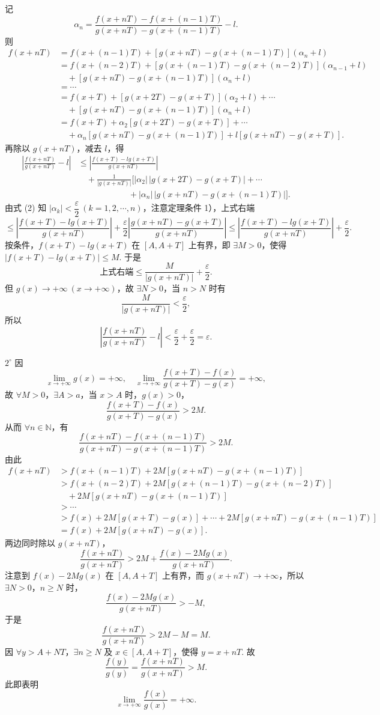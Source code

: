 \documentclass[UTF8, 12pt, fontset=fandol, oneside]{ctexart}
\begin{document}
记
\[
  \alpha_n=
  \frac{f(x+nT)-f(x+(n-1)T)}
  {g(x+nT)-g(x+(n-1)T)}-l. \tag{4}
\]
则
\[
\begin{aligned}
f(x+nT)
&=f(x+(n-1)T)+[g(x+nT)-g(x+(n-1)T)](\alpha_n+l)\\
&=f(x+(n-2)T)+[g(x+(n-1)T)-g(x+(n-2)T)](\alpha_{n-1}+l)\\
&\quad+[g(x+nT)-g(x+(n-1)T)](\alpha_n+l)\\
&=\cdots\\
&=f(x+T)+[g(x+2T)-g(x+T)](\alpha_2+l)+\cdots\\
&\quad+[g(x+nT)-g(x+(n-1)T)](\alpha_n+l)\\
&=f(x+T)+\alpha_2[g(x+2T)-g(x+T)]+\cdots\\
&\quad+\alpha_n[g(x+nT)-g(x+(n-1)T)]
  +l[g(x+nT)-g(x+T)].
\end{aligned}
\]
再除以 $g(x+nT)$，减去 $l$，得
\[
\begin{aligned}
\left|\frac{f(x+nT)}{g(x+nT)}-l\right|
&\le
\left|\frac{f(x+T)-lg(x+T)}{g(x+nT)}\right|\\
&\quad+\frac1{|g(x+nT)|}\bigl[
|\alpha_2|\,|g(x+2T)-g(x+T)|+\cdots\\
&\qquad\qquad\qquad
 +|\alpha_n|\,|g(x+nT)-g(x+(n-1)T)|\bigr].
\end{aligned}
\]
由式 (2) 知 $|\alpha_k|<\dfrac\varepsilon2\ (k=1,2,\cdots,n)$，注意定理条件 1），上式右端
\[
\le
\left|\frac{f(x+T)-lg(x+T)}{g(x+nT)}\right|
+\frac\varepsilon2
\left|\frac{g(x+nT)-g(x+T)}{g(x+nT)}\right|
\le
\left|\frac{f(x+T)-lg(x+T)}{g(x+nT)}\right|+\frac\varepsilon2.
\]
按条件，$f(x+T)-lg(x+T)$ 在 $[A,A+T]$ 上有界，即 $\exists M>0$，使得
$|f(x+T)-lg(x+T)|\le M$. 于是
\[
  \text{上式右端}\le\frac{M}{|g(x+nT)|}+\frac\varepsilon2.
\]
但 $g(x)\to+\infty\ (x\to+\infty)$，故 $\exists N>0$，当 $n>N$ 时有
\[
  \frac{M}{|g(x+nT)|}<\frac\varepsilon2,
\]
所以
\[
  \left|\frac{f(x+nT)}{g(x+nT)}-l\right|
  <\frac\varepsilon2+\frac\varepsilon2=\varepsilon.
\]

$2^\circ$ 因
\[
  \lim_{x\to+\infty}g(x)=+\infty,\quad
  \lim_{x\to+\infty}\frac{f(x+T)-f(x)}{g(x+T)-g(x)}=+\infty,
\]
故 $\forall M>0$，$\exists A>a$，当 $x>A$ 时，$g(x)>0$，
\[
  \frac{f(x+T)-f(x)}{g(x+T)-g(x)}>2M.
\]
从而 $\forall n\in\mathbb N$，有
\[
  \frac{f(x+nT)-f(x+(n-1)T)}
  {g(x+nT)-g(x+(n-1)T)}>2M.
\]
由此
\[
\begin{aligned}
f(x+nT)
&>f(x+(n-1)T)+2M[g(x+nT)-g(x+(n-1)T)]\\
&>f(x+(n-2)T)+2M[g(x+(n-1)T)-g(x+(n-2)T)]\\
&\quad+2M[g(x+nT)-g(x+(n-1)T)]\\
&>\cdots\\
&>f(x)+2M[g(x+T)-g(x)]+\cdots
  +2M[g(x+nT)-g(x+(n-1)T)]\\
&=f(x)+2M[g(x+nT)-g(x)].
\end{aligned}
\]
两边同时除以 $g(x+nT)$，
\[
  \frac{f(x+nT)}{g(x+nT)}
  >2M+\frac{f(x)-2Mg(x)}{g(x+nT)}.
\]
注意到 $f(x)-2Mg(x)$ 在 $[A,A+T]$ 上有界，而 $g(x+nT)\to+\infty$，所以
$\exists N>0$，$n\ge N$ 时，
\[
  \frac{f(x)-2Mg(x)}{g(x+nT)}>-M,
\]
于是
\[
  \frac{f(x+nT)}{g(x+nT)}>2M-M=M.
\]
因 $\forall y>A+NT$，$\exists n\ge N$ 及 $x\in[A,A+T]$，使得 $y=x+nT$. 故
\[
  \frac{f(y)}{g(y)}=\frac{f(x+nT)}{g(x+nT)}>M.
\]
此即表明
\[
  \lim_{x\to+\infty}\frac{f(x)}{g(x)}=+\infty.
\]
\end{document}
